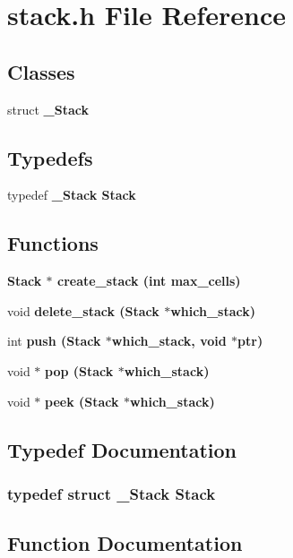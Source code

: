 \section{stack.h File Reference}
\label{stack_8h}
\subsection*{Classes}
\begin{CompactItemize}
\item 
struct \bf{\_\-Stack}
\end{CompactItemize}
\subsection*{Typedefs}
\begin{CompactItemize}
\item 
typedef \bf{\_\-Stack} \bf{Stack}
\end{CompactItemize}
\subsection*{Functions}
\begin{CompactItemize}
\item 
\bf{Stack} $\ast$ \bf{create\_\-stack} (int max\_\-cells)
\item 
void \bf{delete\_\-stack} (\bf{Stack} $\ast$which\_\-stack)
\item 
int \bf{push} (\bf{Stack} $\ast$which\_\-stack, void $\ast$ptr)
\item 
void $\ast$ \bf{pop} (\bf{Stack} $\ast$which\_\-stack)
\item 
void $\ast$ \bf{peek} (\bf{Stack} $\ast$which\_\-stack)
\end{CompactItemize}


\subsection{Typedef Documentation}
\subsubsection{\setlength{\rightskip}{0pt plus 5cm}typedef struct \bf{\_\-Stack} \bf{Stack}}\label{stack_8h_8e01fb06f51699c9a9dc51da4f58769e}




\subsection{Function Documentation}
